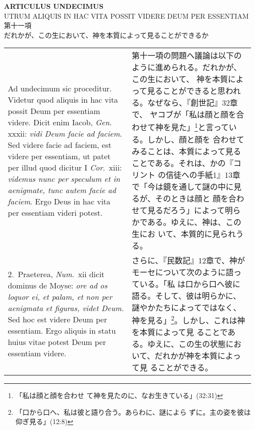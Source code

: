 \documentclass[10pt]{jsarticle} %
\begin{document}
\newpage
{}

\begin{center}
 {\Large {\bf ARTICULUS UNDECIMUS}}\\
 {\large UTRUM ALIQUIS IN HAC VITA POSSIT VIDERE DEUM PER ESSENTIAM\\
第十一項\\
だれかが、この生において、神を本質によって見ることができるか}
\end{center}

\begin{longtable}{p{21em}p{21em}}

{\sc Ad undecimum sic proceditur}. Videtur quod aliquis in hac vita
possit Deum per essentiam videre. Dicit enim Iacob, {\it Gen}.~{\sc
xxxii}: {\it vidi Deum facie ad faciem}. Sed videre facie ad faciem,
est videre per essentiam, ut patet per illud quod dicitur I {\it
Cor}.~{\sc xiii}: {\it videmus nunc per speculum et in aenigmate, tunc
autem facie ad faciem}. Ergo Deus in hac vita per essentiam videri
potest.

&

第十一項の問題へ議論は以下のように進められる。だれかが、この生において、
神を本質によって見ることができると思われる。なぜなら、『創世記』32章で、
ヤコブが「私は顔と顔を合わせて神を見た」\footnote{「私は顔と顔を合わせ
て神を見たのに、なお生きている」(32:31)}と言っている。しかし、顔と顔を
合わせてみることは、本質によって見ることである。それは、かの『コリント
の信徒への手紙1』13章で「今は鏡を通して謎の中に見るが、そのときは顔と
顔を合わせて見るだろう」によって明らかである。ゆえに、神は、この生にお
いて、本質的に見られうる。

\\

2.~{\sc Praeterea}, {\it Num}.~{\sc xii} dicit dominus de Moyse: {\it
 ore ad os loquor ei, et palam, et non per aenigmata et figuras, videt
 Deum}. Sed hoc est videre Deum per essentiam. Ergo aliquis in statu
 huius vitae potest Deum per essentiam videre.

&

さらに、『民数記』12章で、神がモーセについて次のように語っている。「私
は口から口へ彼に語る。そして、彼は明らかに、謎やかたちによってではなく、
神を見る」\footnote{「口から口へ、私は彼と語り合う。あらわに、謎によら
ずに。主の姿を彼は仰ぎ見る」(12:8)}。しかし、これは神を本質によって見
ることである。ゆえに、この生の状態において、だれかが神を本質によって見
ることができる。

\\


\end{longtable}
\end{document}
